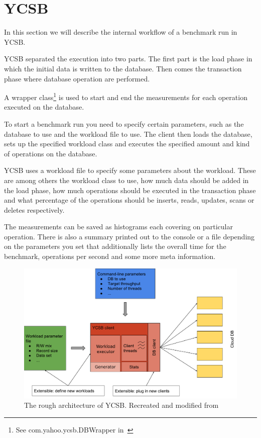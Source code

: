 \section{YCSB}
\label{ch:analysis:se:ycsb}
In this section we will describe the internal workflow of a benchmark run in YCSB.

YCSB separated the execution into two parts.
The first part is the load phase in which the initial data is written to the database.
Then comes the transaction phase where database operation are performed.

A wrapper class\footnote{See com.yahoo.ycsb.DBWrapper in~\cite{Cooper}} is used to start and end the measurements for each operation executed on the database.

To start a benchmark run you need to specify certain parameters,
such as the database to use and the workload file to use.
The client then loads the database,
sets up the specified workload class and executes the specified amount and kind of operations on the database.

YCSB uses a workload file to specify some parameters about the workload.
These are among others the workload class to use,
how much data should be added in the load phase,
how much operations should be executed in the transaction phase and what percentage of the operations should be inserts, reads, updates, scans or deletes respectively.

The measurements can be saved as histograms each covering on particular operation.
There is also a summary printed out to the console or a file depending on the parameters you set that additionally lists the overall time for the benchmark, operations per second and some more meta information.

\begin{figure}
  \centering
  \includegraphics[width=\textwidth]{images/ycsbArchitecture}
  \caption{The rough architecture of YCSB. Recreated and modified from~\cite[25]{Abubakar2014}}
  \label{fig:ycsbArchitecture}
\end{figure}

